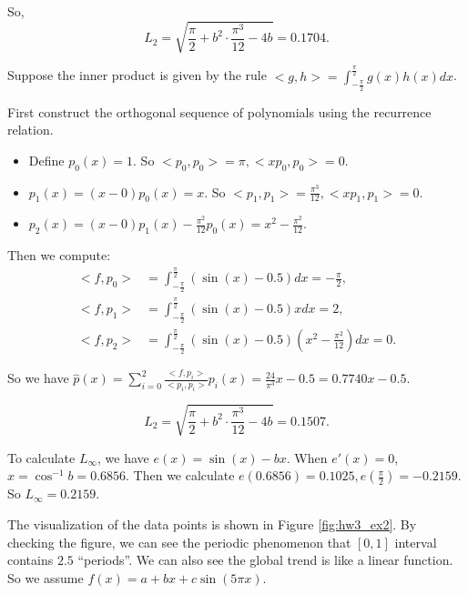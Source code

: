 \documentclass[
  course = {{16-811 Math Fundamentals for Robotics}},
  quartile = {{1}},
  assignment = 3,
  name = {{Kangle Deng}},
  email = {{kangled@andrew.cmu.edu}},
  firstexercise = 1
]{aga-homework}
\begin{document}
So, 
\begin{equation*}
    L_2 = \sqrt{\frac{\pi}{2} + b^2 \cdot \frac{\pi^3}{12} - 4b} = 0.1704.
\end{equation*}

\subexercise
Suppose the inner product is given by the rule $<g,h> = \int_{-\frac{\pi}{2}}^{\frac{\pi}{2}}g(x)h(x)dx$.

First construct the orthogonal sequence of polynomials using the recurrence relation.
\begin{itemize}
    \item Define $p_0(x) = 1.$ So $<p_0,p_0> = \pi, <xp_0, p_0> = 0$.
    \item $p_1(x) = (x-0)p_0(x) = x.$ So $<p_1, p_1> = \frac{\pi^3}{12}, <xp_1, p_1> = 0$.
    \item $p_2(x) = (x-0)p_1(x) - \frac{\pi^2}{12}p_0(x) = x^2 - \frac{\pi^2}{12}$.
\end{itemize}

Then we compute:
\begin{equation*}
    \begin{aligned}
        <f, p_0> & = \int_{-\frac{\pi}{2}}^{\frac{\pi}{2}}(\sin(x) - 0.5)dx = -\frac{\pi}{2}, \\
        <f, p_1> & = \int_{-\frac{\pi}{2}}^{\frac{\pi}{2}}(\sin(x) - 0.5)xdx = 2, \\
        <f, p_2> & = \int_{-\frac{\pi}{2}}^{\frac{\pi}{2}}(\sin(x) - 0.5)(x^2-\frac{\pi^2}{12})dx = 0.
    \end{aligned}
\end{equation*}

So we have $\hat{p}(x) = \sum \limits_{i=0}^2 \frac{<f,p_i>}{<p_i,p_i>}p_i(x) = \frac{24}{\pi^3}x - 0.5 = 0.7740x - 0.5$.

\begin{equation*}
    L_2 = \sqrt{\frac{\pi}{2} + b^2 \cdot \frac{\pi^3}{12} - 4b} = 0.1507.
\end{equation*}

To calculate $L_{\infty}$, we have $e(x) = \sin(x) - bx$. When $e'(x) = 0$, $x = \cos^{-1}b = 0.6856$. Then we calculate $e(0.6856) = 0.1025, e(\frac{\pi}{2}) = -0.2159$. So $L_\infty = 0.2159$.

\exercise
The visualization of the data points is shown in Figure \ref{fig:hw3_ex2}. By checking the figure, we can see the periodic phenomenon that $[0,1]$ interval contains $2.5$ ``periods''. We can also see the global trend is like a linear function. So we assume $f(x) = a + bx + c\sin(5\pi x)$.
\end{document}
